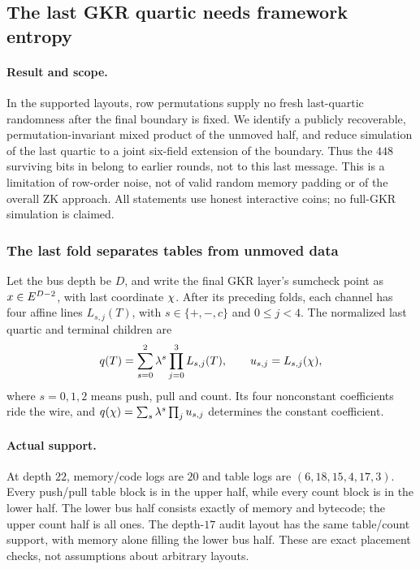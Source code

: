 \subsection{The last GKR quartic needs framework entropy}\label{note:zk-swap-terminal}

\paragraph{Result and scope.} In the supported layouts, row permutations supply no fresh last-quartic randomness after the final boundary is fixed. We identify a publicly recoverable, permutation-invariant mixed product of the unmoved half, and reduce simulation of the last quartic to a joint six-field extension of the boundary. Thus the $448$ surviving bits in  belong to earlier rounds, not to this last message. This is a limitation of row-order noise, not of valid random memory padding or of the overall ZK approach. All statements use honest interactive coins; no full-GKR simulation is claimed.

\subsubsection{The last fold separates tables from unmoved data}

Let the bus depth be $D$, and write the final GKR layer's sumcheck point as $x\in E^{D-2}$, with last coordinate $\chi$. After its preceding folds, each channel has four affine lines $L_{s,j}(T)$, with $s\in\{+,-,c\}$ and $0\le j<4$. The normalized last quartic and terminal children are
\[
 q(T)=\sum_{s=0}^2\lambda^s\prod_{j=0}^3 L_{s,j}(T),
 \qquad u_{s,j}=L_{s,j}(\chi),
\]
where $s=0,1,2$ means push, pull and count. Its four nonconstant coefficients ride the wire, and $q(\chi)=\sum_s\lambda^s\prod_j u_{s,j}$ determines the constant coefficient.

\paragraph{Actual support.} At depth $22$, memory/code logs are $20$ and table logs are $(6,18,15,4,17,3)$. Every push/pull table block is in the upper half, while every count block is in the lower half. The lower bus half consists exactly of memory and bytecode; the upper count half is all ones. The depth-$17$ audit layout has the same table/count support, with memory alone filling the lower bus half. These are exact placement checks, not assumptions about arbitrary layouts.

